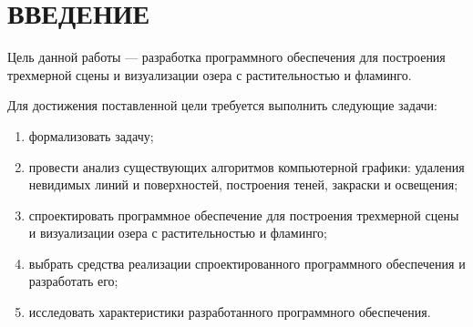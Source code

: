 \chapter*{ВВЕДЕНИЕ}

Цель данной работы --- разработка программного обеспечения для построения трехмерной сцены и визуализации озера с растительностью и фламинго.

Для достижения поставленной цели требуется выполнить следующие задачи:
\begin{enumerate}[label=\arabic*)]
	\item формализовать задачу;
	\item провести анализ существующих алгоритмов компьютерной графики: удаления невидимых линий и поверхностей, построения теней, закраски и освещения;
	\item спроектировать программное обеспечение для построения трехмерной сцены и визуализации озера с растительностью и фламинго;
	\item выбрать средства реализации спроектированного программного обеспечения и разработать его;
	\item исследовать характеристики разработанного программного обеспечения.
\end{enumerate} 
